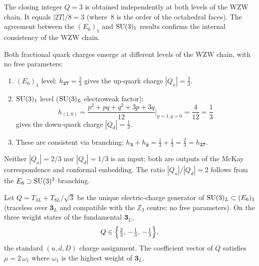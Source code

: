 \begin{remark}[Robustness of $Q_{\mathrm{group}}^{(3)}=3$]
\label{P15:rem:qgroup_robustness}
The closing integer $Q=3$ is obtained independently at both levels
of the WZW chain.
It equals $|2T|/8=3$ (where~8 is the order of the
octahedral faces).
The agreement between the $(E_6)_1$ and $\mathrm{SU}(3)_1$ results
confirms the internal consistency of the WZW chain.
\end{remark}

\begin{theorem}
\label{P15:thm:charge}
Both fractional quark charges emerge at different levels of the
WZW chain, with no free parameters:
\begin{enumerate}[noitemsep,label=(\roman*)]
\item $(E_6)_1$ level: $h_{\mathbf{27}}=\tfrac{2}{3}$
  gives the up-quark charge $|Q_u|=\tfrac{2}{3}$.
\item $\mathrm{SU}(3)_1$ level ($\mathrm{SU}(3)_L$ electroweak factor):
  \begin{equation}
    h_{(1,0)} = \frac{p^2+pq+q^2+3p+3q}{12}\bigg|_{p=1,q=0}
              = \frac{4}{12} = \frac{1}{3}
    \label{P15:eq:hdown}
  \end{equation}
  gives the down-quark charge $|Q_d|=\tfrac{1}{3}$.
\item These are consistent via branching:
  $h_{\mathbf{3}}+h_{\bar{\mathbf{3}}}
  =\tfrac{1}{3}+\tfrac{1}{3}=\tfrac{2}{3}=h_{\mathbf{27}}$.
\end{enumerate}
\end{theorem}

\begin{remark}
\label{P15:rem:both_charges_no_params}
Neither $|Q_u|=2/3$ nor $|Q_d|=1/3$ is an input; both are outputs
of the McKay correspondence and conformal embedding.
The ratio $|Q_u|/|Q_d|=2$ follows from the $E_6\supset\mathrm{SU}(3)^3$
branching.
\end{remark}

\begin{theorem}
\label{P15:thm:charge_generator}
Let $Q = T_{3L}+T_{8L}/\!\sqrt{3}$ be the unique electric-charge
generator of $\mathrm{SU}(3)_L\subset(E_6)_1$ (traceless over $\mathbf{3}_L$
and compatible with the $\mathbb{Z}_3$ centre; no free parameters).
On the three weight states of the fundamental $\mathbf{3}_L$,
\begin{equation}
  Q \in \Bigl\{\tfrac{2}{3},\,-\tfrac{1}{3},\,-\tfrac{1}{3}\Bigr\},
  \label{P15:eq:trinification_charges}
\end{equation}
the standard $(u,d,D)$ charge assignment. The coefficient vector of
$Q$ satisfies $\mu = 2\,\omega_1$ where $\omega_1$ is the highest
weight of $\mathbf{3}_L$.
\end{theorem}

